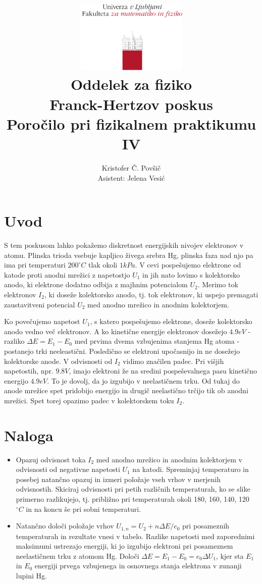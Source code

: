 \documentclass[12pt]{report}
\title{
  \includegraphics[width=0.4\textwidth]{fmf_logo}\\
  {\small Oddelek za fiziko} \\
  {Franck-Hertzov poskus}\\
  {\small Poročilo pri fizikalnem praktikumu IV}\\

}
\date{}
\author{ Kristofer Č. Povšič \\[5 cm]
 \small  Asistent: Jelena Vesić
}
\begin{document}
\setcounter{page}{2}

\maketitle

\chapter*{Uvod}

S tem poskusom lahko pokažemo diskretnost energijskih nivojev elektronov v atomu. Plinska trioda vsebuje kapljico živega srebra Hg, plinska faza nad njo pa ima pri temperaturi $200^\circ C$ tlak okoli $1kPa$. V cevi pospešujemo elektrone od katode proti anodni mrežici z napetostjo $U_1$ in jih nato lovimo s kolektorsko anodo, ki elektrone dodatno odbija z majhnim potencialom $U_2$. Merimo tok elektronov $I_2$, ki doseže kolektorsko anodo, tj. tok elektronov, ki uspejo premagati zaustavitveni potencial $U_2$ med anodno mrežico in anodnim kolektorjem. 

Ko povečujemo napetost $U_1$, s katero pospešujemo elektrone, doseže kolektorsko anodo vedno več elektronov. A ko kinetične energije elektronov dosežejo $4.9\si{eV}$ - razliko $\Delta E = E_1 - E_0$ med prvima dvema vzbujenima stanjema Hg atoma - postanejo trki neeleastični. Posledično se elektroni upočasnijo in ne dosežejo kolektorske anode. V odvisnosti od $I_2$ vidimo značilen padec. Pri višjih napetostih, npr. $9.8\si{V}$, imajo elektroni že na sredini pospeševalnega pasu kinetično energijo $4.9\si{eV}$. To je dovolj, da jo izgubijo v neelastičnem trku. Od tukaj do anode mrežice spet pridobijo energijo in drugič neelastično trčijo tik ob anodni mrežici. Spet torej opazimo padec v kolektorskem toku $I_2$. 

\chapter*{Naloga}

\begin{itemize}
  \item Opazuj odvisnost toka $I_2$ med anodno mrežico in anodnim kolektorjem v odvisnosti od negativne napetosti $U_1$ na katodi. Spreminjaj temperaturo in posebej natančno opazuj in izmeri položaje vseh vrhov v merjenih odvisnostih. Skiciraj odvisnosti pri petih različnih temperaturah, ko se slike primerno razlikujejo, tj. približno pri temperaturah okoli 180, 160, 140, 120 $^\circ C$ in na koncu še pri sobni temperaturi. 
  \item Natančno določi položaje vrhov $U_{1,n} = U_2 + n\Delta E/e_0$ pri posameznih temperaturah in rezultate vnesi v tabelo. Razlike napetosti med zaporednimi maksimumi ustrezajo energiji, ki jo izgubijo elektroni pri posameznem neelastičnem trku z atomom Hg. Določi $\Delta E = E_1 - E_0 = e_0 \Delta U_1$, kjer sta $E_1$ in $E_0$ energiji prvega vzbujenega in osnovnega stanja elektrona v zunanji lupini Hg. 
\end{itemize}
\end{document}
